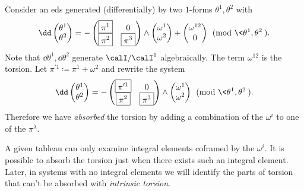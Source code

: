\begin{example}\label{example absorbing torsion}
    Consider an \gls{eds} generated (differentially) by two $1$-forms $\theta^1,\theta^2$ with 
    \[\dd \begin{pmatrix}
        \theta^1\\\theta^2
    \end{pmatrix}=-\begin{pmatrix}
        \boxed{\pi^1} & 0\\
        \boxed{\pi^2} & \boxed{\pi^3}
    \end{pmatrix}\wedge 
    \begin{pmatrix}
        \omega^1\\\omega^2
    \end{pmatrix}
    +\begin{pmatrix}
        \omega^{12}\\0
    \end{pmatrix}\pmod{\<\theta^1,\theta^2\>}.
    \]
    Note that $\dd\theta^1,\dd\theta^2$ generate $\calI\slash\calI^1$ algebraically. The term $\omega^{12}$ is the torsion. Let $\pi^{\prime 1}\coloneqq \pi^1+\omega^2$ and rewrite the system 
    \[\dd \begin{pmatrix}
        \theta^1\\\theta^2
    \end{pmatrix}=-\begin{pmatrix}
        \boxed{\pi^{\prime 1}} & 0\\
        \boxed{\pi^2} & \boxed{\pi^3}
    \end{pmatrix}\wedge 
    \begin{pmatrix}
        \omega^1\\\omega^2
    \end{pmatrix}\pmod{\<\theta^1,\theta^2\>}.
    \]
    Therefore we have \emph{absorbed} the torsion by adding a combination of the $\omega^i$ to one of the $\pi^\lambda$. 
\end{example}

A given tableau can only examine integral elements coframed by the $\omega^i$. It is possible to absorb the torsion just when there exists such an integral element. Later, in systems with no integral elements we will identify the parts of torsion that can't be absorbed with \emph{intrinsic torsion}.



